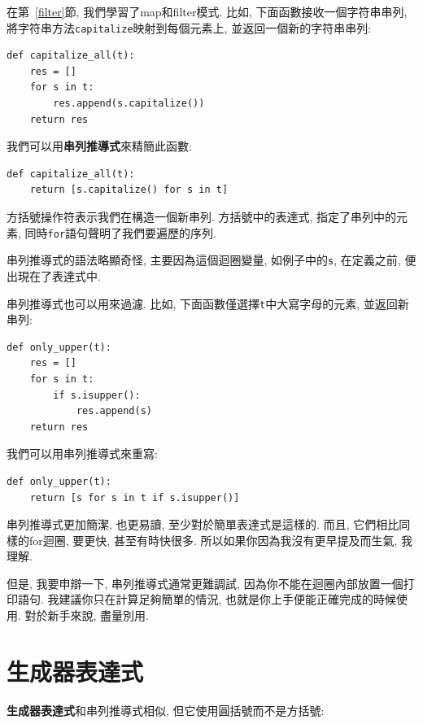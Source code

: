 \documentclass[10pt]{book}
\begin{document}
在第~\ref{filter}節, 我們學習了map和filter模式. 
比如, 下面函數接收一個字符串串列, 將字符串方法{\tt capitalize}映射到每個元素上, 
並返回一個新的字符串串列:

\begin{verbatim}
def capitalize_all(t):
    res = []
    for s in t:
        res.append(s.capitalize())
    return res
\end{verbatim}

我們可以用{\bf 串列推導式}來精簡此函數:

\begin{verbatim}
def capitalize_all(t):
    return [s.capitalize() for s in t]
\end{verbatim}

方括號操作符表示我們在構造一個新串列. 
方括號中的表達式, 指定了串列中的元素, 同時{\tt for}語句聲明了我們要遍歷的序列. 

串列推導式的語法略顯奇怪, 主要因為這個迴圈變量, 如例子中的{\tt s}, 在定義之前, 
便出現在了表達式中. 

串列推導式也可以用來過濾. 
比如, 下面函數僅選擇{\tt t}中大寫字母的元素, 並返回新串列:

\begin{verbatim}
def only_upper(t):
    res = []
    for s in t:
        if s.isupper():
            res.append(s)
    return res
\end{verbatim}

我們可以用串列推導式來重寫:

\begin{verbatim}
def only_upper(t):
    return [s for s in t if s.isupper()]
\end{verbatim}

串列推導式更加簡潔, 也更易讀, 至少對於簡單表達式是這樣的. 
而且, 它們相比同樣的for迴圈, 要更快, 甚至有時快很多. 
所以如果你因為我沒有更早提及而生氣, 我理解. 

但是, 我要申辯一下, 串列推導式通常更難調試, 
因為你不能在迴圈內部放置一個打印語句. 
我建議你只在計算足夠簡單的情況, 也就是你上手便能正確完成的時候使用. 
對於新手來說, 盡量別用. 



\section{生成器表達式}

{\bf 生成器表達式}和串列推導式相似, 但它使用圓括號而不是方括號:
\end{document}
